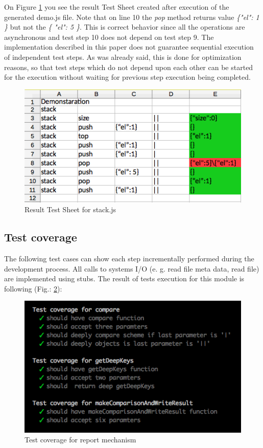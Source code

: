 {On Figure \ref{fig:resultTestSheet} you see the result Test Sheet created after execution of the generated demo.js file. Note that on line 10 the \textit{pop} method returns value \textit{\{"el": 1 \}} but not the \textit{\{ "el": 5 \}}. This is correct behavior since all the operations are asynchronous and test step 10 does not depend on test step 9. The implementation described in this paper does not guarantee sequential execution of independent test steps. As was already said, this is done for optimization reasons, so that test steps which do not depend upon each other can be started for the execution without waiting for previous step execution being completed. 
\begin{figure}[H]
	\centering
	\includegraphics[width=\linewidth]{grafiken/testSheetResult.png}
	\caption{Result Test Sheet for stack.js}
	\label{fig:resultTestSheet}
\end{figure}


\subsection{Test coverage}
The following test cases can show each step incrementally performed during the development process. All calls to systems I/O (e. g. read file meta data, read file) are implemented using stubs.
The result of tests execution  for this module is following (Fig.: \ref{fig:testReport}): 
\begin{figure}[H]
	\centering
	\includegraphics[width=\linewidth]{grafiken/testReport.png}
	\caption{Test coverage for report mechanism}
	\label{fig:testReport}
\end{figure}

}
